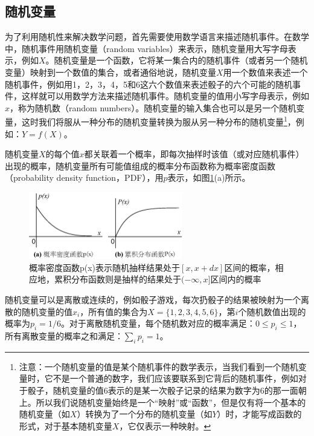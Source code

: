 \subsection{随机变量}
为了利用随机性来解决数学问题，首先需要使用数学语言来描述随机事件。在数学中，随机事件用随机变量（random variables）来表示，随机变量用大写字母表示，例如$X$。随机变量是一个函数，它将某一集合内的随机事件（或者另一个随机变量）映射到一个数值的集合，或者通俗地说，随机变量$X$用一个数值来表述一个随机事件，例如用1，2，3，4，5和6这六个数值来表述骰子的六个可能的随机事件，这样就可以用数学方法来描述随机事件。随机变量的值用小写字母表示，例如$x$，称为随机数（random numbers）。随机变量的输入集合也可以是另一个随机变量，这时我们将服从一种分布的随机变量转换为服从另一种分布的随机变量\footnote{注意：一个随机变量的值是某个随机事件的数学表示，当我们看到一个随机变量时，它不是一个普通的数字，我们应该要联系到它背后的随机事件，例如对于骰子，随机变量的值6表示的是某一次骰子记录的结果为数字为6的那一面朝上。所以我们说随机变量始终是一个“映射”或“函数”，但是仅有将一个基本的随机变量（如$X$）转换为了一个分布的随机变量（如$Y$）时，才能写成函数的形式，对于基本随机变量$X$，它仅表示一种映射。}，例如：$Y=f(X)$。

随机变量$X$的每个值$x$都关联着一个概率，即每次抽样时该值（或对应随机事件）出现的概率，随机变量所有可能值组成的概率分布函数称为概率密度函数（probability density function，PDF），用$p$表示，如图\ref{f:mc-cdf}(a)所示。

\begin{figure}
	\sidecaption
	\includegraphics[width=0.6\textwidth]{figures/mc/cdf}
	\caption{概率密度函数p(x)表示随机抽样结果处于$[x,x+dx]$区间的概率，相应地，累积分布函数则是抽样的结果处于$(-\infty,x]$区间内的概率}
	\label{f:mc-cdf}
\end{figure}

随机变量可以是离散或连续的，例如骰子游戏，每次扔骰子的结果被映射为一个离散的随机变量的值$x_i$，所有值的集合为$X=\{1,2,3,4,5,6\}$，第$i$个随机数值出现的概率为$p_i=1/6$。对于离散随机变量，每个随机数对应的概率满足：$0\leq p_i \leq 1$，所有离散变量的概率之和满足：$\sum_i p_i=1$。

